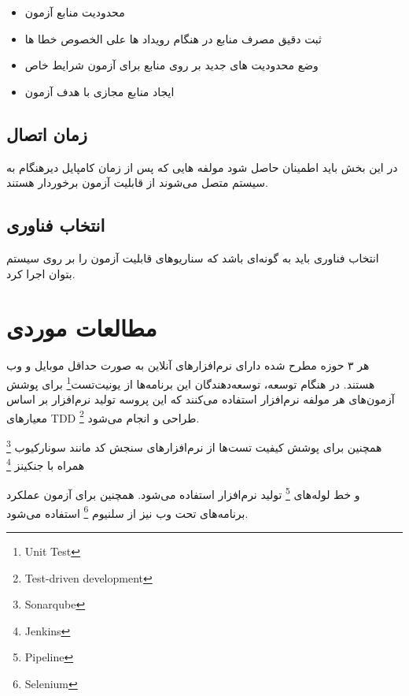 \begin{itemize}
\item
محدودیت منابع آزمون
\item
ثبت دقیق مصرف منابع در هنگام رویداد ها علی الخصوص خطا ها
\item
وضع محدودیت های جدید بر روی منابع برای آزمون شرایط خاص
\item
ایجاد منابع مجازی با هدف آزمون
\end{itemize}
\subsection{زمان اتصال}
در این بخش باید اطمینان حاصل شود مولفه هایی که پس از زمان کامپایل دیرهنگام به سیستم متصل می‌شوند از قابلیت آزمون برخوردار هستند.
\subsection{انتخاب فناوری}
انتخاب فناوری باید به گونه‌ای باشد که سناریو‌های قابلیت آزمون را بر روی سیستم بتوان اجرا کرد.



\section{مطالعات موردی}
هر ۳ حوزه مطرح شده دارای نرم‌افزارهای آنلاین به صورت حداقل موبایل و وب هستند. در هنگام توسعه، توسعه‌دهندگان این برنامه‌ها از یونیت‌تست\footnote{Unit Test}
برای پوشش آزمون‌های هر مولفه نرم‌افزار استفاده می‌کنند که این پروسه تولید نرم‌افزار بر اساس معیارهای TDD \footnote{Test-driven development} طراحی و انجام می‌شود.

همچنین برای پوشش کیفیت تست‌ها از نرم‌افزارهای سنجش کد مانند سونارکیوب
\footnote{Sonarqube}
همراه با جنکینز
\footnote{Jenkins} 

و خط لوله‌های
\footnote{Pipeline}
تولید نرم‌افزار استفاده می‌شود.
همچنین برای آزمون عملکرد برنامه‌های تحت وب نیز از سلنیوم 
\footnote{Selenium}
استفاده می‌شود.